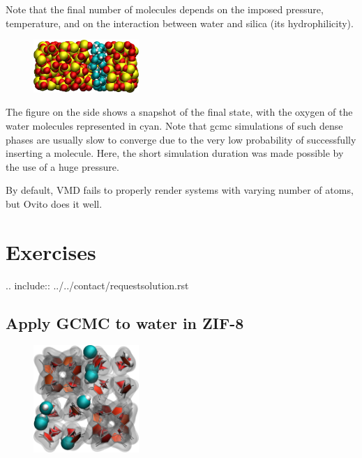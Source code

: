 Note that the final number of molecules depends on the imposed pressure, 
temperature, and on the interaction between water and silica (its hydrophilicity). 

\hspace{-0.45cm}\begin{figure}
\includegraphics[width=4cm]{tutorials/level3/water-adsorption-in-silica/solvated-light.png}
\end{figure}

\noindent The figure on the side shows a snapshot of the final state, with the oxygen of the
water molecules represented in cyan.
Note that gcmc simulations of such dense phases are usually slow to converge due to the
very low probability of successfully inserting a molecule. Here, the short simulation 
duration was made possible by the use of a huge pressure.

\begin{tcolorbox}[colback=mylightblue!5!white,colframe=mylightblue!75!black,title=Vizualising varying number of molecules]
By default, VMD fails to properly render systems with varying number of atoms,
but Ovito does it well.
\end{tcolorbox}

\noindent \section{Exercises}

.. include:: ../../contact/requestsolution.rst

\subsection{Apply GCMC to water in ZIF-8 }

\noindent \hspace{-0.45cm}\begin{figure}
\includegraphics[width=4cm]{tutorials/level3/water-adsorption-in-silica/zif8-light.png}
\end{figure}

